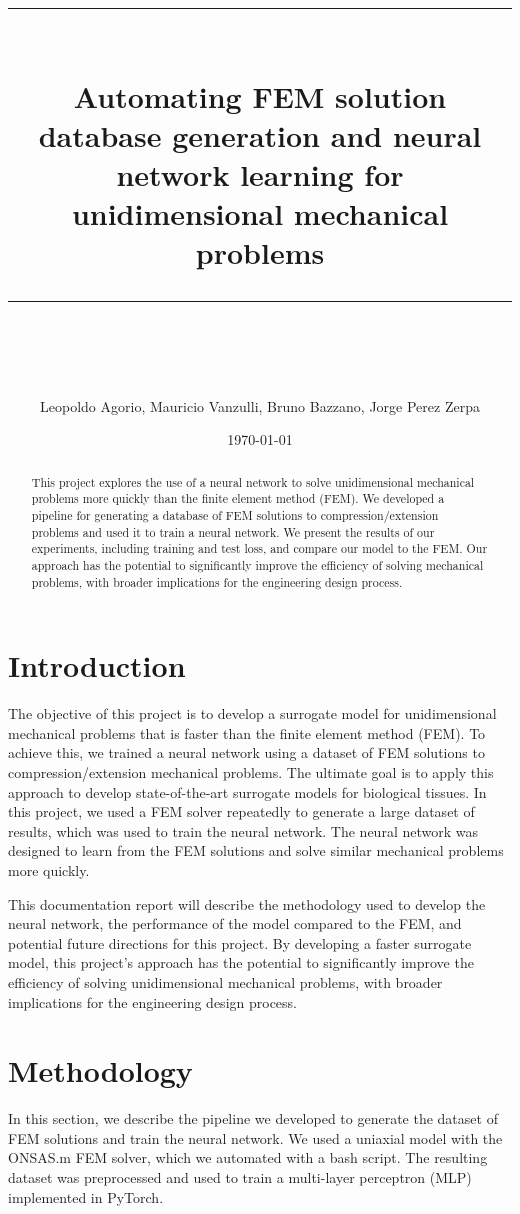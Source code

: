 \documentclass[11pt]{scrartcl} %
\title{	
	\normalfont\normalsize
	\textsc{}\\ %
	\vspace{25pt} %
	\rule{\linewidth}{0.5pt}\\ %
	\vspace{20pt} %
	{\huge Automating FEM solution database generation and neural network learning for unidimensional mechanical problems}\\ %
	\vspace{12pt} %
	\rule{\linewidth}{2pt}\\ %
	\vspace{12pt} %
}
\author{\Large Leopoldo Agorio, Mauricio Vanzulli, Bruno Bazzano, Jorge Perez Zerpa} %
\date{\normalsize\today} %
\begin{document}
\maketitle %


\begin{abstract}
	This project explores the use of a neural network to solve unidimensional mechanical problems more quickly than the finite element method (FEM). We developed a pipeline for generating a database of FEM solutions to compression/extension problems and used it to train a neural network. We present the results of our experiments, including training and test loss, and compare our model to the FEM. Our approach has the potential to significantly improve the efficiency of solving mechanical problems, with broader implications for the engineering design process.
\end{abstract}
\section{Introduction}
The objective of this project is to develop a surrogate model for unidimensional mechanical problems that is faster than the finite element method (FEM). To achieve this, we trained a neural network using a dataset of FEM solutions to compression/extension mechanical problems. The ultimate goal is to apply this approach to develop state-of-the-art surrogate models for biological tissues. In this project, we used a FEM solver repeatedly to generate a large dataset of results, which was used to train the neural network. The neural network was designed to learn from the FEM solutions and solve similar mechanical problems more quickly.

This documentation report will describe the methodology used to develop the neural network, the performance of the model compared to the FEM, and potential future directions for this project. By developing a faster surrogate model, this project's approach has the potential to significantly improve the efficiency of solving unidimensional mechanical problems, with broader implications for the engineering design process.

\section{Methodology}
In this section, we describe the pipeline we developed to generate the dataset of FEM solutions and train the neural network. We used a uniaxial model with the ONSAS.m FEM solver, which we automated with a bash script. The resulting dataset was preprocessed and used to train a multi-layer perceptron (MLP) implemented in PyTorch.
\end{document}
